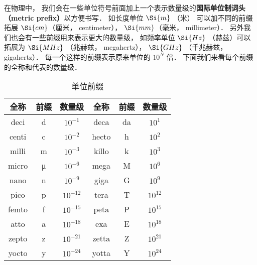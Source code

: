
在物理中， 我们会在一些单位符号前面加上一个表示数量级的\textbf{国际单位制词头（metric prefix）}以方便书写． 如长度单位 $\Si{m}$ （米） 可以加不同的前缀拓展 $\Si{cm}$（厘米， centimeter）， $\Si{mm}$（毫米， millimeter）． 另外我们也会有一些前缀用来表示更大的数量级， 如频率单位 $\Si{Hz}$ （赫兹）可以拓展为 $\Si{MHz}$ （兆赫兹， megahertz）， $\Si{GHz}$ （千兆赫兹， gigahertz）． 每一个这样的前缀表示原来单位的 $10^N$ 倍． 下面我们来看每个前缀的全称和代表的数量级．

\begin{table}[ht]
\centering
\caption{单位前缀}\label{UniPre_tab1}
\begin{tabular}{|c|c|c|c|c|c|}
\hline
全称 & 前缀 & 数量级 & 全称 & 前缀 & 数量级 \\
\hline
deci & d & $10^{-1}$ & deca & da & $10^1$ \\
\hline
centi & c & $10^{-2}$ & hecto & h & $10^2$ \\
\hline
milli & m & $10^{-3}$ & killo & k & $10^3$ \\
\hline
micro & μ & $10^{-6}$ & mega & M & $10^6$ \\
\hline
nano & n & $10^{-9}$ & giga & G & $10^9$ \\
\hline
pico & p & $10^{-12}$ & tera & T & $10^{12}$ \\
\hline
femto & f & $10^{-15}$ & peta & P & $10^{15}$ \\
\hline
atto & a & $10^{-18}$ & exa & E & $10^{18}$ \\
\hline
zepto & z & $10^{-21}$ & zetta & Z & $10^{21}$ \\
\hline
yocto & y & $10^{-24}$ & yotta & Y & $10^{24}$ \\
\hline
\end{tabular}
\end{table}
